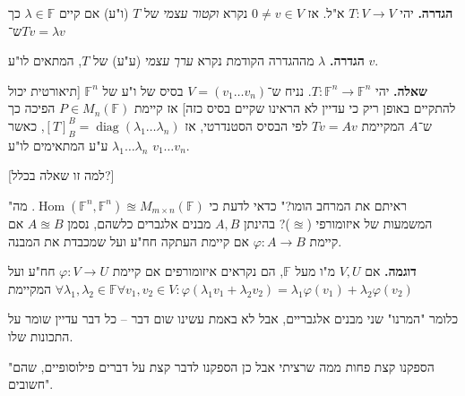 \documentclass[]{article}
\DeclareMathOperator{\diag}    {diag}
\DeclareMathOperator{\Hom}     {Hom}
\newcommand\F         {\mathbb{F}}
\newcommand\co        {\colon}
\renewcommand\lg      {\lambda}
\renewcommand\phi     {\varphi}
\theoremstyle{definition}
\begin{document}
	\textbf{הגדרה. }יהי $T \co V \to V$ א"ל. אז $0 \neq v \in V$ נקרא \textit{וקטור עצמי} של $T$ (ו"ע) אם קיים $\lg \in \F$ כך ש־$T v =\lg v$
	
	\textbf{הגדרה. }$\lg$ מההגדרה הקודמת נקרא \textit{ערך עצמי} (ע"ע) של $T$, המתאים לו"ע $v$. 
	
	\textbf{שאלה. }יהי $T \co \F^n \to \F^n$. נניח ש־$V = (v_1 \dots v_n)$ בסיס של ו"ע של $\F^n$ [תיאורטית יכול להתקיים באופן ריק כי עדיין לא הראינו שקיים בסיס כזה] אז קיימת $P \in M_n(\F)$ הפיכה כך ש־$A$ המקיימת $Tv = Av$ לפי הבסיס הסטנדרטי, אז $[T]^B_B = \diag(\lg_1 \dots \lg_n)$, כאשר $\lg_1 \dots \lg_n$ ע"ע המתאימים לו"ע $v_1 \dots v_n$. 
	
	[למה זו שאלה בכלל?]
	
	"ראיתם את המרחב הומו?"
	כדאי לדעת כי $\Hom(\F^n, \F^n) \approxeq M_{m \times n}(\F)$. מה המשמעות של איזומורפי ($\approxeq$)? בהינתן $A, B$ מבנים אלגברים כלשהם, נסמן $A \approxeq B$ אם קיימת $\phi \co A \to B$ אם קיימת העתקה חח"ע ועל שמכבדת את המבנה. 
	
	\textbf{דוגמה. }אם $V, U$ מ"ו מעל $\F$, הם נקראים איזומורפים אם קיימת $\phi \co V \to U$ חח"ע ועל המקיימת $\forall \lg_1, \lg_2 \in \F \forall v_1, v_2 \in V \co \phi(\lg_1v_1 + \lg_2v_2) = \lg_1\phi(v_1) + \lg_2\phi(v_2)$
	
	כלומר "המרנו" שני מבנים אלגבריים, אבל לא באמת עשינו שום דבר – כל דבר עדיין שומר על התכונות שלו. 
	
	"הספקנו קצת פחות ממה שרציתי אבל כן הספקנו לדבר קצת על דברים פילוסופיים, שהם חשובים". 
	
	
\end{document}
